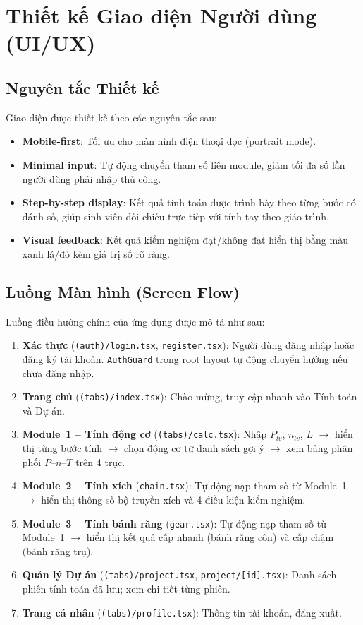 \section{Thiết kế Giao diện Người dùng (UI/UX)}
\label{sec:design-ui}

\subsection{Nguyên tắc Thiết kế}

Giao diện được thiết kế theo các nguyên tắc sau:
\begin{itemize}
  \item \textbf{Mobile-first}: Tối ưu cho màn hình điện thoại dọc (portrait mode).
  \item \textbf{Minimal input}: Tự động chuyển tham số liên module,
        giảm tối đa số lần người dùng phải nhập thủ công.
  \item \textbf{Step-by-step display}: Kết quả tính toán được trình bày
        theo từng bước có đánh số,
        giúp sinh viên đối chiếu trực tiếp với tính tay theo giáo trình.
  \item \textbf{Visual feedback}: Kết quả kiểm nghiệm đạt/không đạt
        hiển thị bằng màu xanh lá/đỏ kèm giá trị số rõ ràng.
\end{itemize}

\subsection{Luồng Màn hình (Screen Flow)}

Luồng điều hướng chính của ứng dụng được mô tả như sau:

\begin{enumerate}
  \item \textbf{Xác thực} (\texttt{(auth)/login.tsx}, \texttt{register.tsx}):
        Người dùng đăng nhập hoặc đăng ký tài khoản.
        \texttt{AuthGuard} trong root layout tự động chuyển hướng nếu chưa đăng nhập.
  \item \textbf{Trang chủ} (\texttt{(tabs)/index.tsx}):
        Chào mừng, truy cập nhanh vào Tính toán và Dự án.
  \item \textbf{Module~1 -- Tính động cơ} (\texttt{(tabs)/calc.tsx}):
        Nhập $P_{lv}$, $n_{lv}$, $L$ $\to$ hiển thị từng bước tính
        $\to$ chọn động cơ từ danh sách gợi ý
        $\to$ xem bảng phân phối $P$--$n$--$T$ trên 4 trục.
  \item \textbf{Module~2 -- Tính xích} (\texttt{chain.tsx}):
        Tự động nạp tham số từ Module~1
        $\to$ hiển thị thông số bộ truyền xích và 4 điều kiện kiểm nghiệm.
  \item \textbf{Module~3 -- Tính bánh răng} (\texttt{gear.tsx}):
        Tự động nạp tham số từ Module~1
        $\to$ hiển thị kết quả cấp nhanh (bánh răng côn)
        và cấp chậm (bánh răng trụ).
  \item \textbf{Quản lý Dự án} (\texttt{(tabs)/project.tsx}, \texttt{project/[id].tsx}):
        Danh sách phiên tính toán đã lưu; xem chi tiết từng phiên.
  \item \textbf{Trang cá nhân} (\texttt{(tabs)/profile.tsx}):
        Thông tin tài khoản, đăng xuất.
\end{enumerate}
